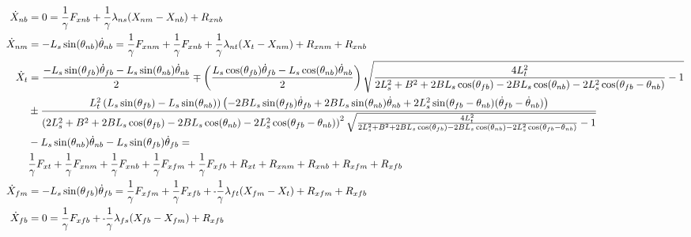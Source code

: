 \documentclass[11pt, landscape]{article}
\newcommand{\mn}{\scalebox{0.7}[1.0]{-}}
\begin{document}
\begin{align}
  \dot{X}_{nb} &= 0 = \frac{1}{\gamma}F_{xnb} + \frac{1}{\gamma}\lambda_{ns}(X_{nm} - X_{nb}) + R_{xnb} \\
  \dot{X}_{nm} &= -L_s\sin(\theta_{nb})\dot{\theta}_{nb} = \frac{1}{\gamma}F_{xnm} + \frac{1}{\gamma}F_{xnb} + \frac{1}{\gamma}\lambda_{nt}(X_{t } - X_{nm}) + R_{xnm} + R_{xnb}\\
  \dot{X}_{t}  &= \frac{-L_s\sin(\theta_{fb})\dot{\theta}_{fb} - L_s\sin(\theta_{nb})\dot{\theta}_{nb}}{2} \mp \left(\frac{L_s\cos(\theta_{fb})\dot{\theta}_{fb} - L_s\cos(\theta_{nb})\dot{\theta}_{nb}}{2}\right)\sqrt{\frac{4L_t^2}{2L_s^2 + B^2 + 2BL_s\cos(\theta_{fb}) - 2BL_s\cos(\theta_{nb}) - 2L_s^2\cos(\theta_{fb} - \theta_{nb})} -1}\\
   &\pm \frac{L_{t}^2\left(L_s\sin(\theta_{fb})-L_s\sin(\theta_{nb})\right)\left(-2BL_s\sin(\theta_{fb})\dot{\theta}_{fb} + 2BL_s\sin(\theta_{nb})\dot{\theta}_{nb} + 2L_s^2\sin(\theta_{fb} - \theta_{nb})(\dot{\theta}_{fb}-\dot{\theta}_{nb})\right)}{\left(2L_s^2 + B^2 + 2BL_s\cos(\theta_{fb}) - 2BL_s\cos(\theta_{nb}) - 2L_s^2\cos(\theta_{fb} - \theta_{nb})\right)^2\sqrt{\frac{4L_t^2}{2L_s^2 + B^2 + 2BL_s\cos(\theta_{fb}) - 2BL_s\cos(\theta_{nb}) - 2L_s^2\cos(\theta_{fb} - \theta_{nb})} -1}}\\ &- L_s\sin(\theta_{nb})\dot{\theta}_{nb} - L_s\sin(\theta_{fb})\dot{\theta}_{fb} =\\ &\frac{1}{\gamma}F_{xt } + \frac{1}{\gamma}F_{xnm} + \frac{1}{\gamma}F_{xnb} + \frac{1}{\gamma}F_{xfm} + \frac{1}{\gamma}F_{xfb} + R_{xt } + R_{xnm} + R_{xnb} + R_{xfm} + R_{xfb}\\
  \dot{X}_{fm} &= -L_s\sin(\theta_{fb})\dot{\theta}_{fb} = \frac{1}{\gamma}F_{xfm} + \frac{1}{\gamma}F_{xfb} + \mn\frac{1}{\gamma}\lambda_{ft}(X_{fm} - X_{t }) + R_{xfm} + R_{xfb} \\
  \dot{X}_{fb} &= 0 = \frac{1}{\gamma}F_{xfb} + \mn\frac{1}{\gamma}\lambda_{fs}(X_{fb} - X_{fm}) + R_{xfb}
\end{align}
\end{document}
